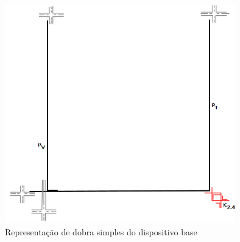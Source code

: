 \begin{figure}[htb]	
\center%
\includegraphics[width=10cm]{./img/gf2.png}
\caption{Representação de dobra simples do dispositivo base}
\label{fig:gadgetBaseSingleBend}
\end{figure}
